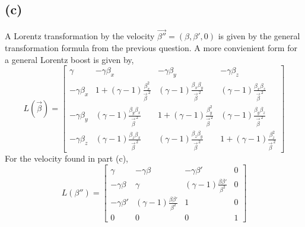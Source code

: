 \documentclass[11pt]{amsart}
\begin{document}
\subsection*{(c)} A Lorentz transformation by the velocity $\vec{\beta''} = (\beta, \beta', 0)$ is given by the general transformation formula from the previous question. A more convienient form for a general Lorentz boost is given by,
\[L(\vec{\beta}) =  \begin{bmatrix}
	\gamma & - \gamma \beta_{x} & - \gamma \beta_{y} & - \gamma \beta_{z} \\
	- \gamma \beta_{x} & 1 + (\gamma - 1)\frac{\beta_{x}^{2}}{\vec{\beta}^{\, 2}} & (\gamma - 1)\frac{\beta_{x} \beta_{y}}{\vec{\beta}^{\, 2}} & (\gamma - 1)\frac{\beta_{x} \beta_{z}}{\vec{\beta}^{\, 2}} \\
	- \gamma \beta_{y} &  (\gamma - 1)\frac{\beta_{y} \beta_{x}}{\vec{\beta}^{\, 2}}  & 1 + (\gamma - 1)\frac{\beta_{y}^{2}}{\vec{\beta}^{\, 2}} & (\gamma - 1)\frac{\beta_{y} \beta_{z}}{\vec{\beta}^{\, 2}}  \\
	- \gamma \beta_{z}  & (\gamma - 1)\frac{\beta_{z} \beta_{x}}{\vec{\beta}^{\, 2}}  & (\gamma - 1)\frac{\beta_{z} \beta_{y}}{\vec{\beta}^{\, 2}}  & 1 + (\gamma - 1)\frac{\beta_{z}^{2}}{\vec{\beta}^{\, 2}}
	\end{bmatrix}\] 
For the velocity found in part (c), 
\[ L(\beta'') = \begin{bmatrix}
	\gamma & - \gamma \beta & - \gamma \beta' & 0 \\
	- \gamma \beta & \gamma & (\gamma - 1)\frac{\beta \beta'}{\beta^2} & 0 \\
	- \gamma \beta' &  (\gamma - 1)\frac{\beta \beta'}{\beta^2}  & 1 & 0  \\
	0  & 0  & 0  & 1
	\end{bmatrix}\] 
\end{document}
